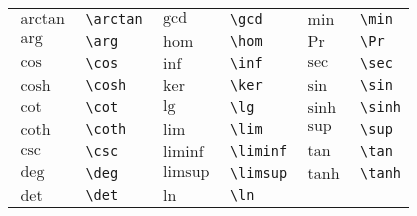 \begin{tabular}{llllll}
$\arctan$            & \verb+\arctan+            & $\gcd$                  & \verb+\gcd+                & $\min$         & \verb+\min+ \\
$\arg$               & \verb+\arg+               & $\hom$                  & \verb+\hom+                & $\Pr$          & \verb+\Pr+ \\
$\cos$               & \verb+\cos+               & $\inf$                  & \verb+\inf+                & $\sec$         & \verb+\sec+ \\
$\cosh$              & \verb+\cosh+              & $\ker$                  & \verb+\ker+                & $\sin$         & \verb+\sin+ \\
$\cot$               & \verb+\cot+               & $\lg$                   & \verb+\lg+                 & $\sinh$        & \verb+\sinh+ \\
$\coth$              & \verb+\coth+              & $\lim$                  & \verb+\lim+                & $\sup$         & \verb+\sup+ \\
$\csc$               & \verb+\csc+               & $\liminf$               & \verb+\liminf+             & $\tan$         & \verb+\tan+ \\
$\deg$               & \verb+\deg+               & $\limsup$               & \verb+\limsup+             & $\tanh$        & \verb+\tanh+ \\
$\det$               & \verb+\det+               & $\ln$                   & \verb+\ln+ \\
\end{tabular}           
\newpage
